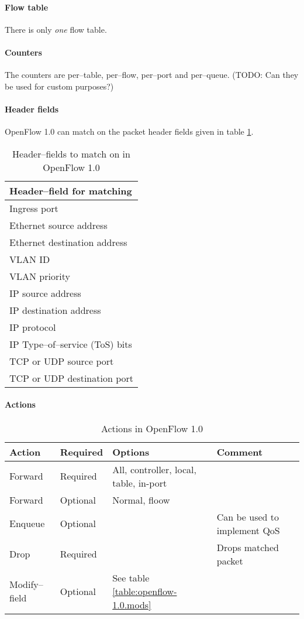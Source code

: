 \paragraph{Flow table}
There is only {\em one} flow table.

\paragraph{Counters}
The counters are per--table, per--flow, per--port and per--queue. (TODO: Can
they be used for custom purposes?)

\paragraph{Header fields} 
OpenFlow 1.0 can match on the packet header fields given in table
\ref{table:openflow-1.0.headers}.

\begin{table}[!htp]
\begin{tabular}{|l|}
\hline \textbf{Header--field for matching} \\
\hline Ingress port \\
\hline Ethernet source address \\
\hline Ethernet destination address \\
\hline VLAN ID \\
\hline VLAN priority \\
\hline IP source address \\
\hline IP destination address \\
\hline IP protocol \\
\hline IP Type--of--service (ToS) bits \\
\hline TCP or UDP source port \\
\hline TCP or UDP destination port \\
\hline
\end{tabular}
\caption{Header--fields to match on in OpenFlow 1.0}
\label{table:openflow-1.0.headers}
\end{table}

\paragraph{Actions}

\begin{table}[!htp]
\begin{tabular}{|l|l|l|l|}
\hline \textbf{Action} &
       \textbf{Required} &
       \textbf{Options} &
       \textbf{Comment} \\
\hline Forward & Required & All, controller, local, table, in-port & \\
\hline Forward & Optional & Normal, floow & \\
\hline Enqueue & Optional &  &  Can be used to implement QoS \\
\hline Drop & Required &  &  Drops matched packet \\
\hline Modify--field & Optional &  See table \ref{table:openflow-1.0.mods}
       & \\
\hline
\end{tabular}
\caption{Actions in OpenFlow 1.0}
\label{table:openflow-1.0.actions}
\end{table}

